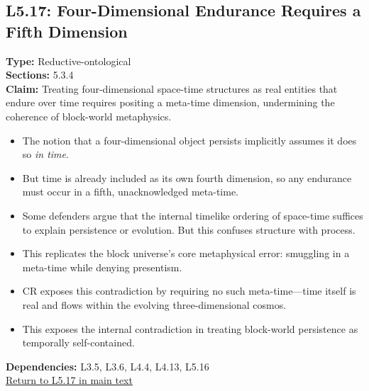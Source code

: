 \documentclass[12pt]{book}
\newcommand{\returnlink}[1]{\hyperref[logic:#1]{Return to #1 in main text}\xspace}
\begin{document}
\subsection*{L5.17: Four-Dimensional Endurance Requires a Fifth Dimension}
\label{appendix:L5.17}
\textbf{Type:} Reductive-ontological \\
\textbf{Sections:} 5.3.4 \\
\textbf{Claim:} Treating four-dimensional space-time structures as real entities that endure over time requires positing a meta-time dimension, undermining the coherence of block-world metaphysics.
\begin{itemize}
  \item The notion that a four-dimensional object persists implicitly assumes it does so \textit{in time}.
  \item But time is already included as its own fourth dimension, so any endurance must occur in a fifth, unacknowledged meta-time.
  \item Some defenders argue that the internal timelike ordering of space-time suffices to explain persistence or evolution. But this confuses structure with process.
  \item This replicates the block universe's core metaphysical error: smuggling in a meta-time while denying presentism.
  \item CR exposes this contradiction by requiring no such meta-time---time itself is real and flows within the evolving three-dimensional cosmos.
  \item This exposes the internal contradiction in treating block-world persistence as temporally self-contained.
\end{itemize}
\textbf{Dependencies:} L3.5, L3.6, L4.4, L4.13, L5.16 \\
\returnlink{L5.17}
\end{document}
